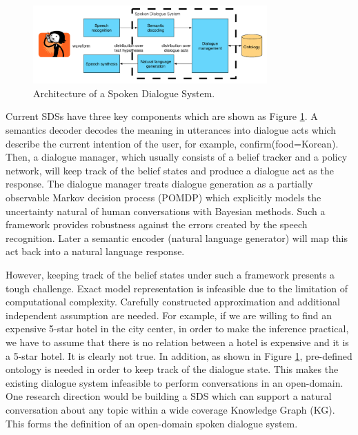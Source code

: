 \documentclass[bsc,frontabs,twoside,singlespacing,parskip,deptreport]{infthesis}     %
\begin{document}
\begin{figure}[h]
    \centering
    \includegraphics[width=0.80\textwidth]{sds.png}
    \caption{Architecture of a Spoken Dialogue System.\cite{gasic}}
    \label{fig:sds}
\end{figure}

Current SDSs have three key components which are shown as Figure \ref{fig:sds}. A semantics decoder decodes the meaning in utterances into dialogue acts which describe the current intention of the user, for example, confirm(food=Korean). Then, a dialogue manager, which usually consists of a belief tracker and a policy network, will keep track of the belief states and produce a dialogue act as the response. The dialogue manager treats dialogue generation as a partially observable Markov decision process (POMDP)\cite{williams2007partially,young2013pomdp,young2010hidden} which explicitly models the uncertainty natural of human conversations with Bayesian methods. Such a framework provides robustness against the errors created by the speech recognition. Later a semantic encoder (natural language generator) will map this act back into a natural language response.

However, keeping track of the belief states under such a framework presents a tough challenge. Exact model representation is infeasible due to the limitation of computational complexity\cite{young2013pomdp}. Carefully constructed approximation and additional independent assumption are needed. For example, if we are willing to find an expensive 5-star hotel in the city center, in order to make the inference practical, we have to assume that there is no relation between a hotel is expensive and it is a 5-star hotel. It is clearly not true. In addition, as shown in Figure \ref{fig:sds}, pre-defined ontology is needed in order to keep track of the dialogue state. This makes the existing dialogue system infeasible to perform conversations in an open-domain. One research direction would be building a SDS which can support a natural conversation about any topic within a wide coverage Knowledge Graph (KG). This forms the definition of an open-domain spoken dialogue system\cite{opendomain}.
\end{document}
